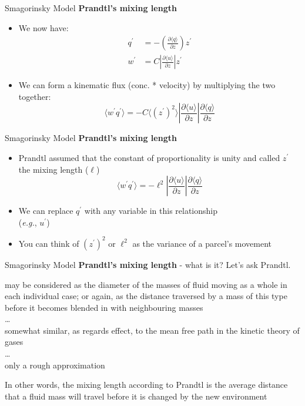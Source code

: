 \begin{frame}{Smagorinsky Model}
\textbf{Prandtl's mixing length}

\begin{itemize}
	\item We now have:
	\begin{align*}
		q^\prime &= -\left(\frac{\partial \langle q\rangle}{\partial z}\right)z^\prime\\
		w^\prime &= C \left| \frac{\partial \langle u\rangle}{\partial z}\right|z^\prime
	\end{align*}
	\item We can form a kinematic flux (conc. * velocity) by multiplying the two together:
	$$\langle w^\prime q^\prime \rangle = -C\langle (z^\prime)^2 \rangle \left| \frac{\partial \langle u\rangle}{\partial z}\right| \frac{\partial \langle q\rangle}{\partial z}$$
\end{itemize}

\end{frame}

\begin{frame}{Smagorinsky Model}
\textbf{Prandtl's mixing length}

\begin{itemize}
	\item Prandtl assumed that the constant of proportionality is unity and called $z^\prime$ the mixing length ($\ell$)  
	$$\langle w^\prime q^\prime \rangle = -\ell^2 \left| \frac{\partial \langle u\rangle}{\partial z}\right| \frac{\partial \langle q\rangle}{\partial z}$$
	\item We can replace $q^\prime$ with any variable in this relationship \\(\textit{e.g.}, $u^\prime$)
	\item You can think of $(z^\prime)^2$ or $\ell^2$ as the variance of a parcel's movement 
\end{itemize}

\end{frame}

\begin{frame}{Smagorinsky Model}
\textbf{Prandtl's mixing length} - what is it? Let's ask Prandtl.

	\begin{fancyquotes}
		may be considered as the diameter of the masses of fluid moving as a whole in each individual case; or again, as the distance traversed by a mass of this type before it becomes blended in with neighbouring masses\\ \ldots \\
		somewhat similar, as regards effect, to the mean free path in the kinetic theory of gases\\ \ldots \\
		only a rough approximation
	\end{fancyquotes}
In other words, the mixing length according to Prandtl is the average distance that a fluid mass will travel before it is changed by the new environment
\end{frame}

